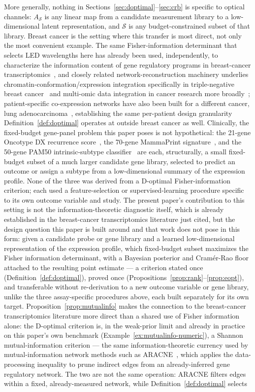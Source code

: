 \documentclass[11pt]{article}
\begin{document}
More generally, nothing in Sections~\ref{sec:doptimal}--\ref{sec:crb} is specific to optical channels: $A_\mathcal{S}$ is any linear map from a candidate measurement library to a low-dimensional latent representation, and $\mathcal{S}$ is any budget-constrained subset of that library. Breast cancer is the setting where this transfer is most direct, not only the most convenient example. The same Fisher-information determinant that selects LED wavelengths here has already been used, independently, to characterize the information content of gene regulatory programs in breast-cancer transcriptomics~\citep{ref29}, and closely related network-reconstruction machinery underlies chromatin-conformation/expression integration specifically in triple-negative breast cancer~\citep{ref36} and multi-omic data integration in cancer research more broadly~\citep{ref35}; patient-specific co-expression networks have also been built for a different cancer, lung adenocarcinoma~\citep{ref37}, establishing the same per-patient design granularity Definition~\ref{def:doptimal} operates at outside breast cancer as well. Clinically, the fixed-budget gene-panel problem this paper poses is not hypothetical: the 21-gene Oncotype DX recurrence score~\citep{ref43}, the 70-gene MammaPrint signature~\citep{ref44}, and the 50-gene PAM50 intrinsic-subtype classifier~\citep{ref45} are each, structurally, a small fixed-budget subset of a much larger candidate gene library, selected to predict an outcome or assign a subtype from a low-dimensional summary of the expression profile. None of the three was derived from a D-optimal Fisher-information criterion; each used a feature-selection or supervised-learning procedure specific to its own outcome variable and study. The present paper's contribution to this setting is not the information-theoretic diagnostic itself, which is already established in the breast-cancer transcriptomics literature just cited, but the design question this paper is built around and that work does not pose in this form: given a candidate probe or gene library and a learned low-dimensional representation of the expression profile, which fixed-budget subset maximizes the Fisher information determinant, with a Bayesian posterior and Cram\'{e}r-Rao floor attached to the resulting point estimate --- a criterion stated once (Definition~\ref{def:doptimal}), proved once (Propositions~\ref{prop:rank}--\ref{prop:eopt}), and transferable without re-derivation to a new outcome variable or gene library, unlike the three assay-specific procedures above, each built separately for its own target. Proposition~\ref{prop:mutualinfo} makes the connection to the breast-cancer transcriptomics literature more direct than a shared use of Fisher information alone: the D-optimal criterion is, in the weak-prior limit and already in practice on this paper's own benchmark (Example~\ref{ex:mutualinfo-numeric}), a Shannon mutual-information criterion --- the same information-theoretic currency used by mutual-information network methods such as ARACNE~\citep{ref34}, which applies the data-processing inequality to prune indirect edges from an already-inferred gene regulatory network. The two are not the same operation: ARACNE filters edges within a fixed, already-measured network, while Definition~\ref{def:doptimal} selects 
\end{document}
